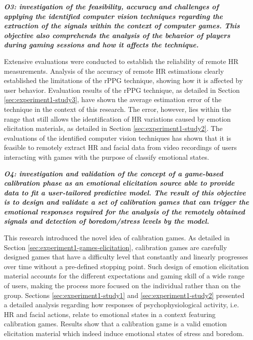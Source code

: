 \textit{\textbf{O3: investigation of the feasibility, accuracy and challenges of applying the identified computer vision techniques regarding the extraction of the signals within the context of computer games. This objective also comprehends the analysis of the behavior of players during gaming sessions and how it affects the technique.}}

Extensive evaluations were conducted to establish the reliability of remote HR measurements. Analysis of the accuracy of remote HR estimations clearly established the limitations of the rPPG technique, showing how it is affected by user behavior. Evaluation results of the rPPG technique, as detailed in Section \ref{sec:experiment1-study3}, have shown the average estimation error of the technique in the context of this research. The error, however, lies within the range that still allows the identification of HR variations caused by emotion elicitation materials, as detailed in Section \ref{sec:experiment1-study2}. The evaluations of the identified computer vision techniques has shown that it is feasible to remotely extract HR and facial data from video recordings of users interacting with games with the purpose of classify emotional states.


\textit{\textbf{O4: investigation and validation of the concept of a game-based calibration phase as an emotional elicitation source able to provide data to fit a user-tailored predictive model. The result of this objective is to design and validate a set of calibration games that can trigger the emotional responses required for the analysis of the remotely obtained signals and detection of boredom/stress levels by the model.}}

This research introduced the novel idea of calibration games. As detailed in Section \ref{sec:experiment1-games-elicitation}, calibration games are carefully designed games that have a difficulty level that constantly and linearly progresses over time without a pre-defined stopping point. Such design of emotion elicitation material accounts for the different expectations and gaming skill of a wide range of users, making the process more focused on the individual rather than on the group. Sections \ref{sec:experiment1-study1} and \ref{sec:experiment1-study2} presented a detailed analysis regarding how responses of psychophysiological activity, i.e. HR and facial actions, relate to emotional states in a context featuring calibration games. Results show that a calibration game is a valid emotion elicitation material which indeed induce emotional states of stress and boredom.

